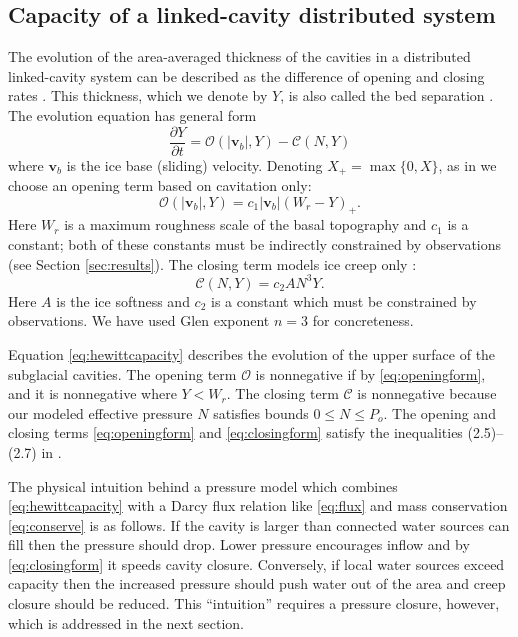 \documentclass[gmd]{copernicus}   %
\newcommand\bv{\mathbf{v}}
\begin{document}
\subsection{Capacity of a linked-cavity distributed system}  The evolution of the area-averaged thickness of the cavities in a distributed linked-cavity system can be described as the difference of opening and closing rates \citep{Hewitt2011}.  This thickness, which we denote by $Y$, is also called the bed separation \citep{Bartholomausetal2011}.  The evolution equation has general form
\begin{equation}
\frac{\partial Y}{\partial t} = \mathcal{O}(|\bv_b|,Y) - \mathcal{C}(N,Y) \label{eq:hewittcapacity}
\end{equation}
where $\bv_b$ is the ice base (sliding) velocity.  Denoting $X_+= \max\{0,X\}$, as in \cite{Schoofetal2012} we choose an opening term based on cavitation only:
\begin{equation}
\mathcal{O}(|\bv_b|,Y) = c_1 |\bv_b| (W_r - Y)_+. \label{eq:openingform}
\end{equation}
Here $W_r$ is a maximum roughness scale of the basal topography and $c_1$ is a constant; both of these constants must be indirectly constrained by observations (see Section \ref{sec:results}).  The closing term models ice creep only \citep{Hewitt2011,Schoofetal2012}:
\begin{equation}
\mathcal{C}(N,Y) = c_2 A N^3 Y. \label{eq:closingform}
\end{equation}
Here $A$ is the ice softness and $c_2$ is a constant which must be constrained by observations.  We have used Glen exponent $n=3$ for concreteness.

Equation \eqref{eq:hewittcapacity} describes the evolution of the upper surface of the subglacial cavities.  The opening term $\mathcal{O}$ is nonnegative if by \eqref{eq:openingform}, and it is nonnegative where $Y<W_r$.  The closing term $\mathcal{C}$ is nonnegative because our modeled effective pressure $N$ satisfies bounds $0\le N \le P_o$.  The opening and closing terms \eqref{eq:openingform} and \eqref{eq:closingform} satisfy the inequalities (2.5)--(2.7) in \cite{Schoofetal2012}.

The physical intuition behind a pressure model which combines \eqref{eq:hewittcapacity} with a Darcy flux relation like \eqref{eq:flux} and mass conservation \eqref{eq:conserve} is as follows.  If the cavity is larger than connected water sources can fill then the pressure should drop.  Lower pressure encourages inflow and by \eqref{eq:closingform} it speeds cavity closure.  Conversely, if local water sources exceed capacity then the increased pressure should push water out of the area and creep closure should be reduced.  This ``intuition'' requires a pressure closure, however, which is addressed in the next section.
\end{document}
